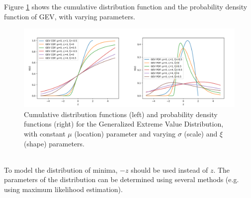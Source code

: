 \documentclass[11pt]{article}
\begin{document}
        Figure \ref{fig:gev} shows the cumulative distribution function and the probability density function of GEV, with varying parameters.\\
        \begin{figure}[t!]
            \centering
            \includegraphics[width=\textwidth]{fig_theory/gev.png}
            \caption{Cumulative distribution functions (left) and probability density functions (right) for the Generalized Extreme Value Distribution, with constant $\mu$ (location) parameter and varying $\sigma$ (scale) and $\xi$ (shape) parameters.}
            \label{fig:gev}
        \end{figure}\\
        To model the distribution of minima, $-z$ should be used instead of $z$. The parameters of the distribution can be determined using several methods (e.g. using maximum likelihood estimation).
\end{document}
